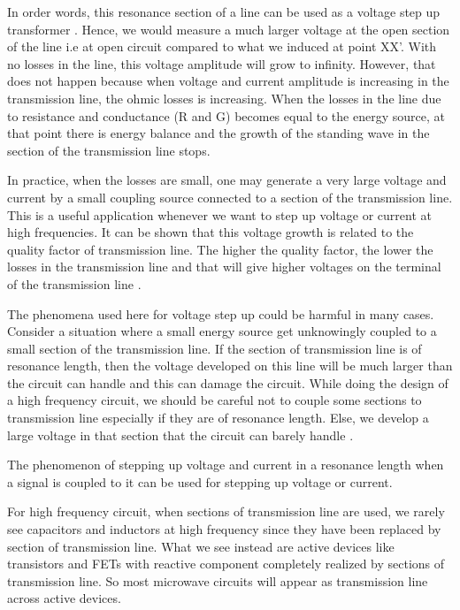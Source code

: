 In order words, this resonance section of a line can be used  as a voltage step up transformer . Hence,  we would  measure  a much  larger  voltage at the open section of the line i.e at open circuit compared  to what we induced at point XX'. With no losses in the line, this voltage  amplitude will grow to infinity. However, that does  not happen because when voltage and current amplitude is increasing in the transmission line, the ohmic losses is increasing. When the losses in  the line due to resistance and conductance (R and G) becomes equal to the  energy source, at that point there is energy balance and the growth of the standing wave in the section of the transmission line stops.

In practice, when the losses are small, one may generate a very large  voltage and current by a small coupling  source  connected  to a section  of the transmission line. This  is a useful application whenever we want to step up voltage or current at high frequencies. It can be shown that this voltage growth is related to the quality factor of transmission line. The higher the quality factor, the lower the losses in the transmission line and that will give higher voltages on the terminal of the transmission line .

The phenomena used here for voltage step up could be harmful in many cases. Consider a situation where a small energy source get unknowingly coupled to a small section of the transmission line. If the section of transmission line is of resonance length, then the voltage developed on this line will be much larger than the circuit can handle and this can damage the circuit. While doing the design of a high frequency circuit, we should be careful not to couple some sections to transmission line especially if they are of resonance length. Else, we develop a large voltage in that section that the circuit can barely handle .  

The phenomenon of stepping up voltage and current in a resonance length when a signal is coupled to it can be used for stepping up voltage or current.

For high frequency circuit, when sections of transmission line are used, we rarely see capacitors and inductors at high frequency since they have been replaced by section of transmission line. What we see instead are active devices like transistors and FETs with reactive component completely realized by sections of transmission line. So most microwave circuits will appear as transmission line  across active devices.   